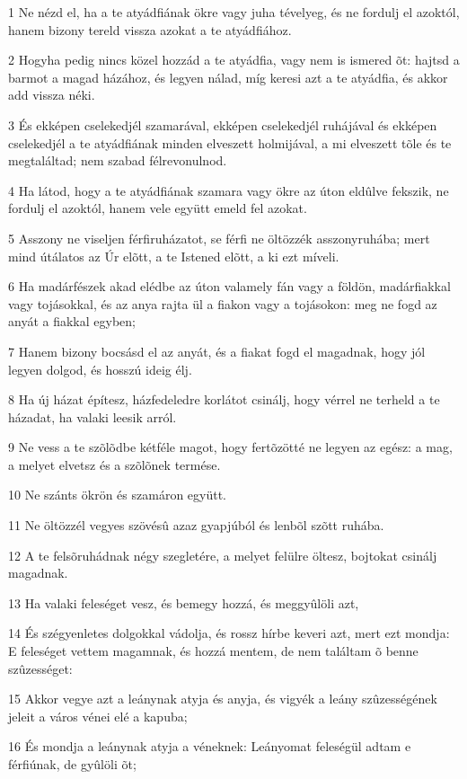 \par 1 Ne nézd el, ha a te atyádfiának ökre vagy juha tévelyeg, és ne fordulj el azoktól, hanem bizony tereld vissza azokat a te atyádfiához.
\par 2 Hogyha pedig nincs közel hozzád a te atyádfia, vagy nem is ismered õt: hajtsd a barmot a magad házához, és legyen nálad, míg keresi azt a te atyádfia, és akkor add vissza néki.
\par 3 És ekképen cselekedjél szamarával, ekképen cselekedjél ruhájával és ekképen cselekedjél a te atyádfiának minden elveszett holmijával, a mi elveszett tõle és te megtaláltad; nem szabad félrevonulnod.
\par 4 Ha látod, hogy a te atyádfiának szamara vagy ökre az úton eldûlve fekszik, ne fordulj el azoktól, hanem vele együtt emeld fel azokat.
\par 5 Asszony ne viseljen férfiruházatot, se férfi ne öltözzék asszonyruhába; mert mind útálatos az Úr elõtt, a te Istened elõtt, a ki ezt míveli.
\par 6 Ha madárfészek akad elédbe az úton valamely fán vagy a földön, madárfiakkal vagy tojásokkal, és az anya rajta ül a fiakon vagy a tojásokon: meg ne fogd az anyát a fiakkal egyben;
\par 7 Hanem bizony bocsásd el az anyát, és a fiakat fogd el magadnak, hogy jól legyen dolgod, és hosszú ideig élj.
\par 8 Ha új házat építesz, házfedeledre korlátot csinálj, hogy vérrel ne terheld a te házadat, ha valaki leesik arról.
\par 9 Ne vess a te szõlõdbe kétféle magot, hogy fertõzötté ne legyen az egész: a mag, a melyet elvetsz és a szõlõnek termése.
\par 10 Ne szánts ökrön és szamáron együtt.
\par 11 Ne öltözzél vegyes szövésû azaz gyapjúból és lenbõl szõtt ruhába.
\par 12 A te felsõruhádnak négy szegletére, a melyet felülre öltesz, bojtokat csinálj magadnak.
\par 13 Ha valaki feleséget vesz, és bemegy hozzá, és meggyûlöli azt,
\par 14 És szégyenletes dolgokkal vádolja, és rossz hírbe keveri azt, mert ezt mondja: E feleséget vettem magamnak, és hozzá mentem, de nem találtam õ benne szûzességet:
\par 15 Akkor vegye azt a leánynak atyja és anyja, és vigyék a leány szûzességének jeleit a város vénei elé a kapuba;
\par 16 És mondja a leánynak atyja a véneknek: Leányomat feleségül adtam e férfiúnak, de gyûlöli õt;
